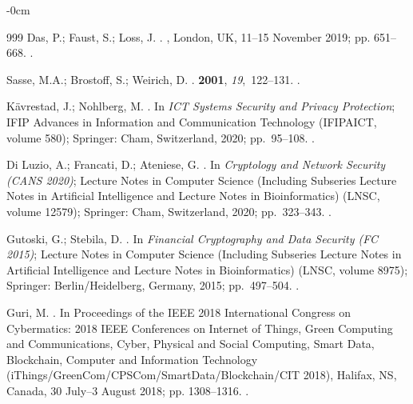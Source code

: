 \documentclass[mathematics,article,accept,pdftex,moreauthors]{Definitions/mdpi}
\begin{document}
\begin{adjustwidth}{-\extralength}{0cm}
\begin{thebibliography}{999}
Das, P.; Faust, S.; Loss, J.
.
, London, UK, 11--15 November 2019;  pp. 651--668.
.

Sasse, M.A.; Brostoff, S.; Weirich, D.
.
 {\bf 2001}, {\em 19},~122--131.
.

K{\"{a}}vrestad, J.; Nohlberg, M.
.
\newblock In \emph{ICT Systems Security and Privacy Protection}; {IFIP Advances in Information and Communication Technology} (IFIPAICT, volume 580); Springer: Cham, Switzerland,  2020; pp.~95--108.
.

{Di Luzio}, A.; Francati, D.; Ateniese, G.
.
\newblock In \emph{Cryptology and Network Security
(CANS 2020)}; {Lecture Notes in Computer Science (Including Subseries Lecture
  Notes in Artificial Intelligence and Lecture Notes in Bioinformatics)} (LNSC, volume 12579);  Springer: Cham, Switzerland,  2020; pp.~323--343.
.

Gutoski, G.; Stebila, D.
.
\newblock In \emph{Financial Cryptography and Data Security
(FC 2015)}; { Lecture Notes in Computer Science (Including Subseries Lecture
  Notes in Artificial Intelligence and Lecture Notes in Bioinformatics)} (LNSC, volume 8975);  Springer:  Berlin/Heidelberg, Germany, 2015; pp.~497--504.
.

Guri, M.
.
\newblock In Proceedings of the IEEE 2018 International Congress
  on Cybermatics: 2018 IEEE Conferences on Internet of Things, Green Computing
  and Communications, Cyber, Physical and Social Computing, Smart Data,
  Blockchain, Computer and Information Technology 
  (iThings/GreenCom/CPSCom/SmartData/Blockchain/CIT 2018), Halifax, NS, Canada, 30 July--3 August 2018; pp. 1308--1316.
.


\end{thebibliography}
\end{adjustwidth}
\end{document}
